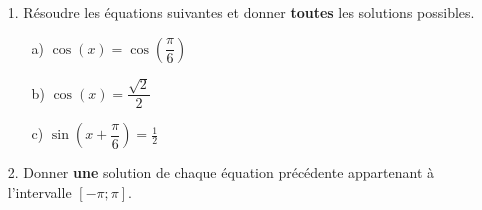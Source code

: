 \documentclass[12pt]{article}
\begin{document}
\begin{enumerate}
\item[1.] Résoudre les équations suivantes et donner \textbf{toutes} les solutions possibles.
  \begin{multicols}{3}
    \begin{enumerate}
    \item[a)] $\cos(x) = \cos(\dfrac{\pi}{6})$
    \item[b)] $\cos(x) = \dfrac{\sqrt{2}}{2}$
    \item[c)] $\sin(x + \dfrac{\pi}{6}) = \frac{1}{2}$ 
    \end{enumerate}
  \end{multicols}
\item[2.] Donner \textbf{une} solution de chaque équation précédente appartenant à l'intervalle $[- \pi ; \pi]$.
\end{enumerate}
\end{document}
